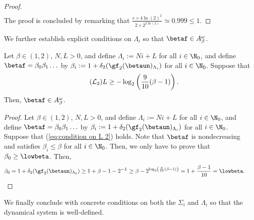 \begin{proof}
\begin{align}
	\end{align}
	The proof is concluded by remarking that $\frac{e \times 4\ln(2)^2}{2 \times 2^{2\ln(2)}} \simeq 0.999 \leq 1$.
\end{proof}
\noindent We further establish explicit conditions on $\Lambda_i$ so that $\betaf \in A_\beta^\omega$.
\begin{lemma}\label{lem:condition on L for beta in A beta}
	Let $\beta \in (1,2)$, $N,L > 0$, and define $\Lambda_i := Ni + L$ for all $i \in \N_0$, and define $\betaf = \beta_0\beta_1\ldots$ by $\beta_i := 1 + \delta_2(\gf_2(\betaun)_{\Lambda_i})$ for all $i \in \N_0$. Suppose that 
	\begin{equation}\label{eq:condition on L 2}
		\tag{\text{$\mathcal L_2$}}
		L \geq - \log_2\left(\frac{9}{10}(\beta-1)\right).
	\end{equation}
	Then, $\betaf \in A_\beta^\omega$.
\end{lemma}
\begin{proof}
	Let $\beta \in (1,2)$, $N,L > 0$, and define $\Lambda_i := Ni + L$ for all $i \in \N_0$, and define $\betaf = \beta_0\beta_1\ldots$ by $\beta_i := 1 + \delta_2(\gf_2(\betaun)_{\Lambda_i})$ for all $i \in \N_0$.  Suppose that (\ref{eq:condition on L 2}) holds. Note that $\betaf$ is nondecreasing and satisfies $\beta_i \leq \beta$ for all $i \in \N_0$. Then, we only have to prove that $\beta_0 \geq \lowbeta$. Then,
	\begin{align}
		\beta_0 = 1 + \delta_2(\gf_2(\betaun)_{\Lambda_0}) &\geq 1 + \beta - 1 - 2^{-L} \geq \beta - 2^{\log_2\left(\frac{9}{10}(\beta-1)\right)} = 1 + \frac{\beta-1}{10} = \lowbeta . 
	\end{align}
\end{proof}

We finally conclude with concrete conditions on both the $\Sigma_i$ and $\Lambda_i$ so that the dynamical system is well-defined.

